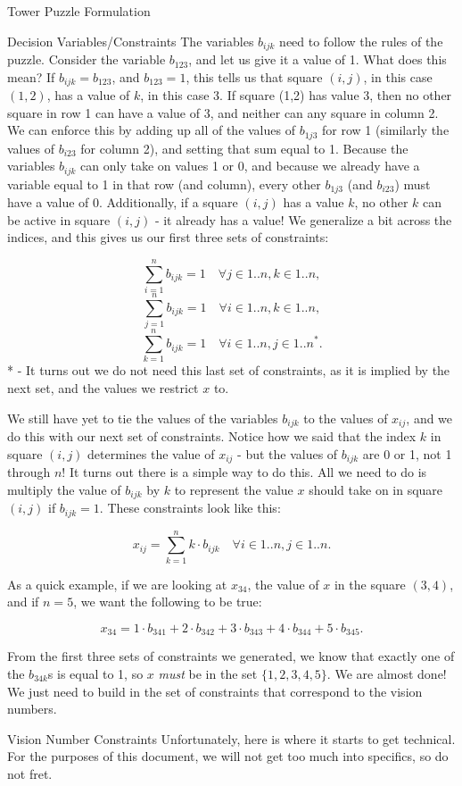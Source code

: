 \documentclass[12pt]{article}
\begin{document}
\begin{section}{Tower Puzzle Formulation}
\begin{subsection}{Decision Variables/Constraints}
The variables $b_{ijk}$ need to follow the rules of the puzzle. Consider the variable $b_{123}$, and let us give it a value of 1. What does this mean? If $b_{ijk}=b_{123}$, and $b_{123}=1$, this tells us that square $(i,j)$, in this case $(1,2)$, has a value of $k$, in this case 3. If square (1,2) has value 3, then no other square in row 1 can have a value of 3, and neither can any square in column 2. We can enforce this by adding up all of the values of $b_{1j3}$ for row 1 (similarly the values of $b_{i23}$ for column 2), and setting that sum equal to 1. Because the variables $b_{ijk}$ can only take on values 1 or 0, and because we already have a variable equal to 1 in that row (and column), every other $b_{1j3}$ (and $b_{i23}$) must have a value of 0. Additionally, if a square $(i,j)$ has a value $k$, no other $k$ can be active in square $(i,j)$ - it already has a value! We generalize a bit across the indices, and this gives us our first three sets of constraints:

\[\sum_{i=1}^{n}b_{ijk} = 1 \quad \forall j\in{1..n},k\in{1..n},\]
\[\sum_{j=1}^{n}b_{ijk} = 1 \quad \forall i\in{1..n},k\in{1..n},\]
\[\sum_{k=1}^{n}b_{ijk} = 1 \quad \forall i\in{1..n},j\in{1..n}^*.\]
* - It turns out we do not need this last set of constraints, as it is implied by the next set, and the values we restrict $x$ to.

We still have yet to tie the values of the variables $b_{ijk}$ to the values of $x_{ij}$, and we do this with our next set of constraints. Notice how we said that the index $k$ in square $(i,j)$ determines the value of $x_{ij}$ - but the values of $b_{ijk}$ are 0 or 1, not 1 through $n$! It turns out there is a simple way to do this. All we need to do is multiply the value of $b_{ijk}$ by $k$ to represent the value $x$ should take on in square $(i,j)$ if $b_{ijk}=1$. These constraints look like this:

\[x_{ij} = \sum_{k=1}^nk\cdot b_{ijk} \quad \forall i\in{1..n},j\in{1..n}.\]

As a quick example, if we are looking at $x_{34}$, the value of $x$ in the square $(3,4)$, and if $n=5$, we want the following to be true:

\[x_{34} = 1\cdot b_{341} + 2\cdot b_{342} + 3\cdot b_{343} + 4\cdot b_{344} + 5\cdot b_{345}.\]

From the first three sets of constraints we generated, we know that exactly one of the $b_{34k}$s is equal to 1, so $x$ \textit{must} be in the set $\{1,2,3,4,5\}$. We are almost done! We just need to build in the set of constraints that correspond to the vision numbers.
\end{subsection}
\begin{subsection}{Vision Number Constraints}
Unfortunately, here is where it starts to get technical. For the purposes of this document, we will not get too much into specifics, so do not fret.


\end{subsection}
\end{section}
\end{document}
